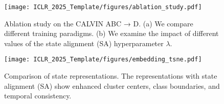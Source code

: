 \begin{figure}[tbp]
\centering
\texttt{[image: ICLR\_2025\_Template/figures/ablation\_study.pdf]}
\vspace{-1em}
\caption{
Ablation study on the CALVIN ABC → D. (a) We compare different training paradigms.
(b) We examine the impact of different values of the state alignment (SA) hyperparameter $\lambda$.
} 
  \label{fig:ablationStudy}
\end{figure}

\begin{figure}[tbp]
\centering
\texttt{[image: ICLR\_2025\_Template/figures/embedding\_tsne.pdf]}
\vspace{-1em}
\caption{
Comparison of state representations. 
The representations with state alignment (SA) show enhanced cluster centers, class boundaries, and temporal consistency.
} 
 \vspace{-1.5em}
  \label{fig:embedding_tsne}
\end{figure}



